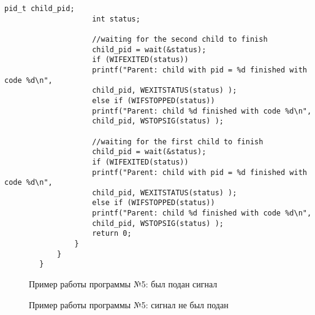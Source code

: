\documentclass[12pt]{report}
\begin{document}
\begin{lstlisting}[label=five,caption = Установка своего обработчика сигнала, style = CStyle]
					pid_t child_pid;
					int status;
					
					//waiting for the second child to finish
					child_pid = wait(&status);
					if (WIFEXITED(status))
					printf("Parent: child with pid = %d finished with code %d\n",
					child_pid, WEXITSTATUS(status) );
					else if (WIFSTOPPED(status))
					printf("Parent: child %d finished with code %d\n",
					child_pid, WSTOPSIG(status) );
					
					//waiting for the first child to finish	 
					child_pid = wait(&status);
					if (WIFEXITED(status))
					printf("Parent: child with pid = %d finished with code %d\n",
					child_pid, WEXITSTATUS(status) );
					else if (WIFSTOPPED(status))
					printf("Parent: child %d finished with code %d\n",
					child_pid, WSTOPSIG(status) );
					return 0;
				}
			}
		}
	\end{lstlisting}
	\begin{figure}[H]
		\caption{Пример работы программы №5: был подан сигнал}
		\label{ris:task5-1}
	\end{figure}
	\begin{figure}[H]
		\caption{Пример работы программы №5: сигнал не был подан}
		\label{ris:task5-2}
	\end{figure}
	\newpage
	
	
	
\end{document}
